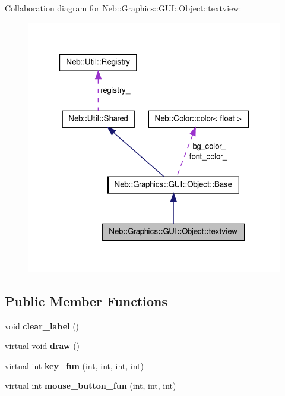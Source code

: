 \-Collaboration diagram for \-Neb\-:\-:\-Graphics\-:\-:\-G\-U\-I\-:\-:\-Object\-:\-:textview\-:\nopagebreak
\begin{figure}[H]
\begin{center}
\leavevmode
\includegraphics[width=321pt]{classNeb_1_1Graphics_1_1GUI_1_1Object_1_1textview__coll__graph}
\end{center}
\end{figure}
\subsection*{\-Public \-Member \-Functions}
\begin{DoxyCompactItemize}
\item 
\hypertarget{classNeb_1_1Graphics_1_1GUI_1_1Object_1_1textview_a9b8d894b0c9895cd70115d4c8d4ac9df}{void {\bfseries clear\-\_\-label} ()}\label{classNeb_1_1Graphics_1_1GUI_1_1Object_1_1textview_a9b8d894b0c9895cd70115d4c8d4ac9df}

\item 
\hypertarget{classNeb_1_1Graphics_1_1GUI_1_1Object_1_1textview_ade347f76e2a54f473ce4a396528818ef}{virtual void {\bfseries draw} ()}\label{classNeb_1_1Graphics_1_1GUI_1_1Object_1_1textview_ade347f76e2a54f473ce4a396528818ef}

\item 
\hypertarget{classNeb_1_1Graphics_1_1GUI_1_1Object_1_1textview_a264b7bc89e6283dcfadfb04b23d1438a}{virtual int {\bfseries key\-\_\-fun} (int, int, int, int)}\label{classNeb_1_1Graphics_1_1GUI_1_1Object_1_1textview_a264b7bc89e6283dcfadfb04b23d1438a}

\item 
\hypertarget{classNeb_1_1Graphics_1_1GUI_1_1Object_1_1textview_a33de4fb3bcfd4bae2a757827d58ca9ca}{virtual int {\bfseries mouse\-\_\-button\-\_\-fun} (int, int, int)}\label{classNeb_1_1Graphics_1_1GUI_1_1Object_1_1textview_a33de4fb3bcfd4bae2a757827d58ca9ca}

\end{DoxyCompactItemize}



